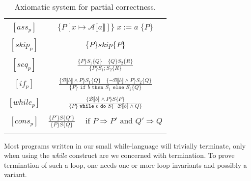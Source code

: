 \begin{table}[h!]
\centering
\begin{tabular}{|c c|} 
 \hline
	& \\
 $[ass_p ]$ & $\{ P[x \mapsto \mathcal{A} \llbracket a \rrbracket ] \} \; x := a \; \{ P \}$ \\ 
	& \\
 $[skip_p ]$ & $\{ P \} skip \{ P \}$ \\ 
	& \\
 $[seq_p ]$ & 
		$\frac{\{ P \} S_1 \{Q \} \quad \{ Q\} S_2 \{ R \}}{\{ P \} S_1;S_2 \{ R \}}$ \\ 
	& \\
 $[if_p ]$ & 
		$\frac{ \{\mathcal{B} \llbracket b \rrbracket \land P \} S_1 \{ Q \} \quad 
           \{ \neg \mathcal{B} \llbracket b \rrbracket \land P\} S_2 \{ Q \} }
          {\{P\} \texttt{ if } b \texttt{ then } S_1 \texttt{ else } S_2 \{Q\}}$ \\
	& \\
 $[while_p ]$ & 
		$\frac{ \{\mathcal{B} \llbracket b \rrbracket \land P \} S \{ P \}}
          {\{P\} \texttt{ while } b \texttt{ do } S 
           \{\neg \mathcal{B} \llbracket b \rrbracket \land Q\}}$ \\
	& \\
 $[cons_p ]$ & 
		$\frac{ \{P'\} S \{Q'\}}{\{P\} S \{Q\}} \quad 
     \text{ if } P \Rightarrow P' \text{ and } Q' \Rightarrow Q $ \\
	& \\
 \hline
\end{tabular}
\caption{Axiomatic system for partial correctness.}
\label{table:axiomatic}
\end{table}




Most programs written in our small while-language will trivially terminate, only when using the \textit{while} construct are we concerned with termination. To prove termination of such a loop, one needs one or more loop invariants and possibly a variant. 

